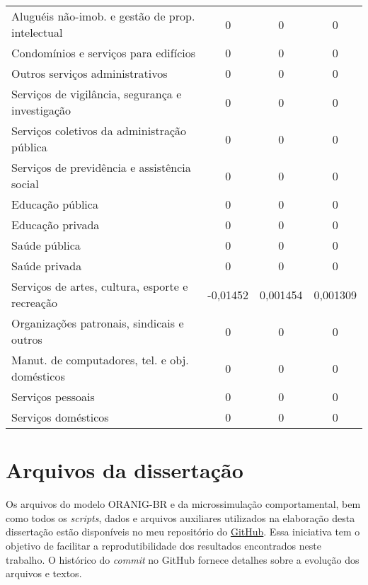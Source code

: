 \begin{apendicesenv}
\begin{small}
\begin{center}
\begin{longtable}{m{8cm}ccc}
				Aluguéis não-imob. e gestão de prop. intelectual   & 0 & 0 & 0 \\
				Condomínios e serviços para edifícios              & 0 & 0 & 0 \\
				Outros serviços administrativos                    & 0 & 0 & 0 \\
				Serviços de vigilância, segurança e investigação   & 0 & 0 & 0 \\
				Serviços coletivos da administração pública        & 0 & 0 & 0 \\
				Serviços de previdência e assistência social       & 0 & 0 & 0 \\
				Educação pública                                   & 0 & 0 & 0 \\
				Educação privada                                   & 0 & 0 & 0 \\
				Saúde pública                                      & 0 & 0 & 0 \\
				Saúde privada                                      & 0 & 0 & 0 \\
				Serviços de artes, cultura, esporte e recreação    & -0,01452 & 0,001454 & 0,001309 \\
				Organizações patronais, sindicais e outros         & 0 & 0 & 0 \\
				Manut. de computadores, tel. e obj. domésticos     & 0 & 0 & 0 \\
				Serviços pessoais                                  & 0 & 0 & 0 \\
				Serviços domésticos                                & 0 & 0 & 0 \\ \hline
			\end{longtable}
		\end{center}
	\end{small}

	\newpage

	\chapter{Arquivos da dissertação} \label{ap:c}

	Os arquivos do modelo ORANIG-BR e da microssimulação comportamental, bem como todos os \textit{scripts}, dados e arquivos auxiliares utilizados na elaboração desta dissertação estão disponíveis no meu repositório do \href{https://github.com/felipeduplat/master-thesis}{GitHub}. Essa iniciativa tem o objetivo de facilitar a reprodutibilidade dos resultados encontrados neste trabalho. O histórico do \textit{commit} no GitHub fornece detalhes sobre a evolução dos arquivos e textos.

\end{apendicesenv}


